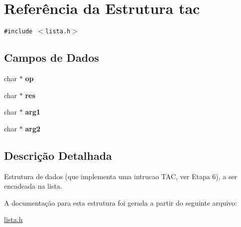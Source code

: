 \hypertarget{structtac}{
\section{Referência da Estrutura tac}
\label{structtac}
}
{\tt \#include $<$lista.h$>$}

\subsection*{Campos de Dados}
\begin{CompactItemize}
\item 
\hypertarget{structtac_95f9c50b359afc15df11bdbf029651d7}{
char $\ast$ \textbf{op}}
\label{structtac_95f9c50b359afc15df11bdbf029651d7}

\item 
\hypertarget{structtac_b9916cad43f718ed7a316e94ce80bab1}{
char $\ast$ \textbf{res}}
\label{structtac_b9916cad43f718ed7a316e94ce80bab1}

\item 
\hypertarget{structtac_473f301b4f09061170fd4042cec395cf}{
char $\ast$ \textbf{arg1}}
\label{structtac_473f301b4f09061170fd4042cec395cf}

\item 
\hypertarget{structtac_6fb90118ff84ebfb171852afd4a31a37}{
char $\ast$ \textbf{arg2}}
\label{structtac_6fb90118ff84ebfb171852afd4a31a37}

\end{CompactItemize}


\subsection{Descrição Detalhada}
Estrutura de dados (que implementa uma intrucao TAC, ver Etapa 6), a ser encadeada na lista. 

A documentação para esta estrutura foi gerada a partir do seguinte arquivo:\begin{CompactItemize}
\item 
\hyperlink{lista_8h}{lista.h}\end{CompactItemize}
